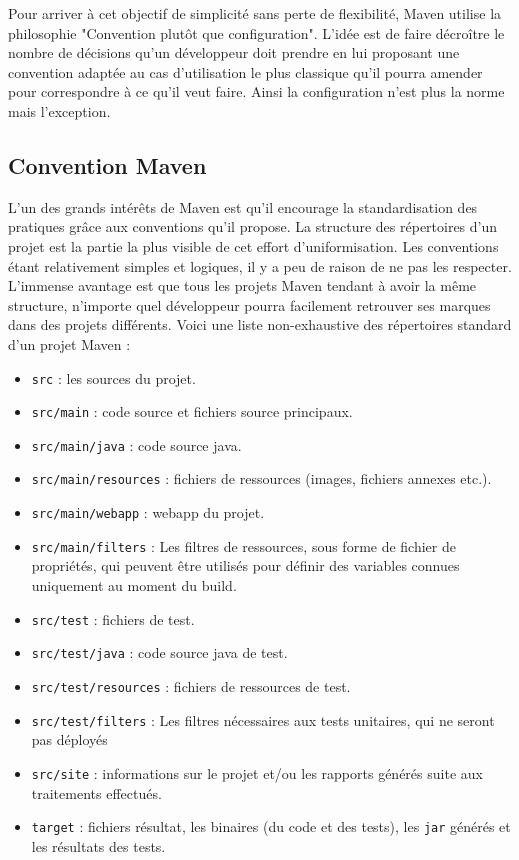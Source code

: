\documentclass[a4paper,11pt]{article}
\begin{document}
Pour arriver à cet objectif de simplicité sans perte de flexibilité, Maven utilise la philosophie "Convention plutôt que 
configuration". L'idée est de faire décroître le nombre de décisions qu'un développeur doit prendre en lui proposant une 
convention adaptée au cas d'utilisation le plus classique qu'il pourra amender pour correspondre à ce qu'il veut faire.
Ainsi la configuration n'est plus la norme mais l'exception.

\subsection{Convention Maven}
L'un des grands intérêts de Maven est qu'il encourage la standardisation des pratiques grâce aux conventions qu'il propose.
La structure des répertoires d'un projet est la partie la plus visible de cet effort d'uniformisation. Les conventions 
étant relativement simples et logiques, il y a peu de raison de ne pas les respecter. L'immense avantage est 
que tous les projets Maven tendant à avoir la même structure, n'importe quel développeur pourra facilement retrouver 
ses marques dans des projets différents. Voici une liste non-exhaustive des répertoires standard d'un projet Maven :

\begin{itemize}
  \item\texttt{src} : les sources du projet.
  \item\texttt{src/main} : code source et fichiers source principaux.
  \item\texttt{src/main/java} : code source java.
  \item\texttt{src/main/resources} : fichiers de ressources (images, fichiers annexes etc.).
  \item\texttt{src/main/webapp} : webapp du projet.
  \item\texttt{src/main/filters} : Les filtres de ressources, sous forme de fichier de propriétés, qui peuvent être 
  utilisés pour définir des variables connues uniquement au moment du build.
  \item\texttt{src/test} : fichiers de test.
  \item\texttt{src/test/java} : code source java de test.
  \item\texttt{src/test/resources} : fichiers de ressources de test.
  \item\texttt{src/test/filters} : Les filtres nécessaires aux tests unitaires, qui ne seront pas déployés
  \item\texttt{src/site} : informations sur le projet et/ou les rapports générés suite aux traitements effectués.
  \item\texttt{target} : fichiers résultat, les binaires (du code et des tests), les \texttt{jar} générés et les 
  résultats des tests.
\end{itemize}
\end{document}
